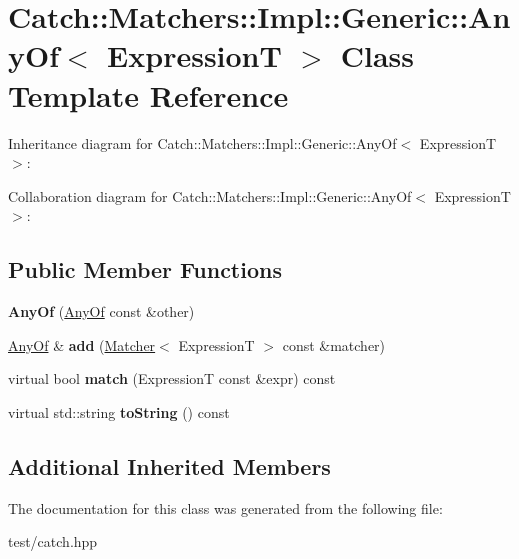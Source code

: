 \hypertarget{classCatch_1_1Matchers_1_1Impl_1_1Generic_1_1AnyOf}{}\section{Catch\+:\+:Matchers\+:\+:Impl\+:\+:Generic\+:\+:Any\+Of$<$ ExpressionT $>$ Class Template Reference}
\label{classCatch_1_1Matchers_1_1Impl_1_1Generic_1_1AnyOf}


Inheritance diagram for Catch\+:\+:Matchers\+:\+:Impl\+:\+:Generic\+:\+:Any\+Of$<$ ExpressionT $>$\+:


Collaboration diagram for Catch\+:\+:Matchers\+:\+:Impl\+:\+:Generic\+:\+:Any\+Of$<$ ExpressionT $>$\+:
\subsection*{Public Member Functions}
\begin{DoxyCompactItemize}
\item 
{\bfseries Any\+Of} (\hyperlink{classCatch_1_1Matchers_1_1Impl_1_1Generic_1_1AnyOf}{Any\+Of} const \&other)\hypertarget{classCatch_1_1Matchers_1_1Impl_1_1Generic_1_1AnyOf_a74fbc05b32d334fcbfd0fae0163a404e}{}\label{classCatch_1_1Matchers_1_1Impl_1_1Generic_1_1AnyOf_a74fbc05b32d334fcbfd0fae0163a404e}

\item 
\hyperlink{classCatch_1_1Matchers_1_1Impl_1_1Generic_1_1AnyOf}{Any\+Of} \& {\bfseries add} (\hyperlink{structCatch_1_1Matchers_1_1Impl_1_1Matcher}{Matcher}$<$ ExpressionT $>$ const \&matcher)\hypertarget{classCatch_1_1Matchers_1_1Impl_1_1Generic_1_1AnyOf_a3bce94b627551e5f96c5f9c6060413f0}{}\label{classCatch_1_1Matchers_1_1Impl_1_1Generic_1_1AnyOf_a3bce94b627551e5f96c5f9c6060413f0}

\item 
virtual bool {\bfseries match} (ExpressionT const \&expr) const \hypertarget{classCatch_1_1Matchers_1_1Impl_1_1Generic_1_1AnyOf_a2f97a08338e12deba541043a57d73db9}{}\label{classCatch_1_1Matchers_1_1Impl_1_1Generic_1_1AnyOf_a2f97a08338e12deba541043a57d73db9}

\item 
virtual std\+::string {\bfseries to\+String} () const \hypertarget{classCatch_1_1Matchers_1_1Impl_1_1Generic_1_1AnyOf_a7ecc6ec08b2018a643923a9d450aa328}{}\label{classCatch_1_1Matchers_1_1Impl_1_1Generic_1_1AnyOf_a7ecc6ec08b2018a643923a9d450aa328}

\end{DoxyCompactItemize}
\subsection*{Additional Inherited Members}


The documentation for this class was generated from the following file\+:\begin{DoxyCompactItemize}
\item 
test/catch.\+hpp\end{DoxyCompactItemize}
